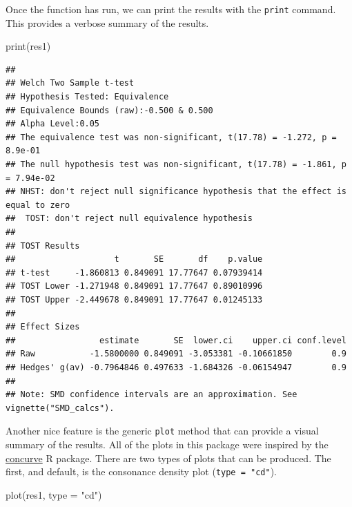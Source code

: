 \documentclass[]{interact}
\theoremstyle{plain}%
\theoremstyle{definition}
\theoremstyle{remark}
\newenvironment{Shaded}{\begin{snugshade}}{\end{snugshade}}
\newcommand{\AttributeTok}[1]{\textcolor[rgb]{0.77,0.63,0.00}{#1}}
\newcommand{\FunctionTok}[1]{\textcolor[rgb]{0.00,0.00,0.00}{#1}}
\newcommand{\NormalTok}[1]{#1}
\newcommand{\StringTok}[1]{\textcolor[rgb]{0.31,0.60,0.02}{#1}}
\begin{document}
Once the function has run, we can print the results with the
\texttt{print} command. This provides a verbose summary of the results.

\begin{Shaded}
\begin{Highlighting}[]
\FunctionTok{print}\NormalTok{(res1)}
\end{Highlighting}
\end{Shaded}

\begin{verbatim}
## 
## Welch Two Sample t-test
## Hypothesis Tested: Equivalence
## Equivalence Bounds (raw):-0.500 & 0.500
## Alpha Level:0.05
## The equivalence test was non-significant, t(17.78) = -1.272, p = 8.9e-01
## The null hypothesis test was non-significant, t(17.78) = -1.861, p = 7.94e-02
## NHST: don't reject null significance hypothesis that the effect is equal to zero 
##  TOST: don't reject null equivalence hypothesis
## 
## TOST Results 
##                    t       SE       df    p.value
## t-test     -1.860813 0.849091 17.77647 0.07939414
## TOST Lower -1.271948 0.849091 17.77647 0.89010996
## TOST Upper -2.449678 0.849091 17.77647 0.01245133
## 
## Effect Sizes 
##                 estimate       SE  lower.ci    upper.ci conf.level
## Raw           -1.5800000 0.849091 -3.053381 -0.10661850        0.9
## Hedges' g(av) -0.7964846 0.497633 -1.684326 -0.06154947        0.9
## 
## Note: SMD confidence intervals are an approximation. See vignette("SMD_calcs").
\end{verbatim}

Another nice feature is the generic \texttt{plot} method that can
provide a visual summary of the results. All of the plots in this
package were inspired by the
\href{https://cran.r-project.org/package=concurve}{concurve} R package.
There are two types of plots that can be produced. The first, and
default, is the consonance density plot (\texttt{type\ =\ "cd"}).

\begin{Shaded}
\begin{Highlighting}[]
\FunctionTok{plot}\NormalTok{(res1, }\AttributeTok{type =} \StringTok{"cd"}\NormalTok{)}
\end{Highlighting}
\end{Shaded}
\end{document}

